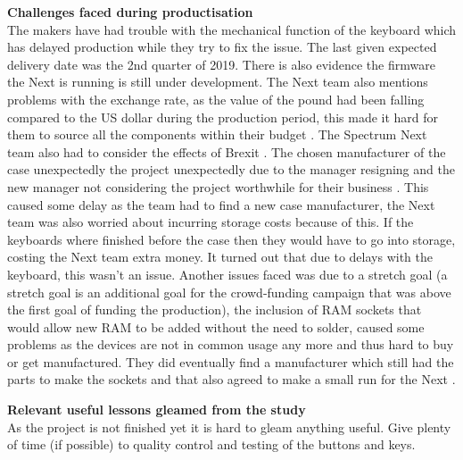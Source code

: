 \textbf{Challenges faced during productisation}\\
The makers have had trouble with the mechanical function of the keyboard which has delayed production while they try to fix the issue. The last given expected delivery date was the 2nd quarter of 2019. There is also evidence the firmware the Next is running is still under development. The Next team also mentions problems with the exchange rate, as the value of the pound had been falling compared to the US dollar during the production period, this made it hard for them to source all the components within their budget 
\cite{RN159}. The Spectrum Next team also had to consider the effects of Brexit 
\cite{RN157}. The chosen manufacturer of the case unexpectedly the project unexpectedly due to the manager resigning and the new manager not considering the project worthwhile for their business 
\cite{RN158}. This caused some delay as the team had to find a new case manufacturer, the Next team was also worried about incurring storage costs because of this. If the keyboards where finished before the case then they would have to go into storage, costing the Next team extra money. It turned out that due to delays with the keyboard, this wasn't an issue. Another issues faced was due to a stretch goal (a stretch goal is an additional goal for the crowd-funding campaign that was above the first goal of funding the production), the inclusion of RAM sockets that would allow new RAM to be added without the need to solder, caused some problems as the devices are not in common usage any more and thus hard to buy or get manufactured. They did eventually find a manufacturer which still had the parts to make the sockets and that also agreed to make a small run for the Next 
\cite{RN159}. 

\textbf{Relevant useful lessons gleamed from the study}\\
As the project is not finished yet it is hard to gleam anything useful. Give plenty of time (if possible) to quality control and testing of the buttons and keys.

